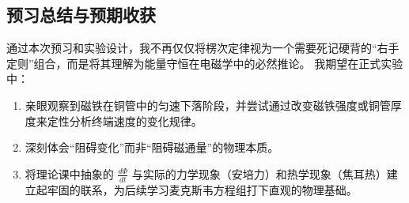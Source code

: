 \documentclass[a4paper,12pt]{article}
\begin{document}
\subsection{预习总结与预期收获}
通过本次预习和实验设计，我不再仅仅将楞次定律视为一个需要死记硬背的“右手定则”组合，而是将其理解为能量守恒在电磁学中的必然推论。
我期望在正式实验中：
\begin{enumerate}
    \item 亲眼观察到磁铁在铜管中的匀速下落阶段，并尝试通过改变磁铁强度或铜管厚度来定性分析终端速度的变化规律。
    \item 深刻体会“阻碍变化”而非“阻碍磁通量”的物理本质。
    \item 将理论课中抽象的 $\frac{d\Phi}{dt}$ 与实际的力学现象（安培力）和热学现象（焦耳热）建立起牢固的联系，为后续学习麦克斯韦方程组打下直观的物理基础。
\end{enumerate}
\end{document}
